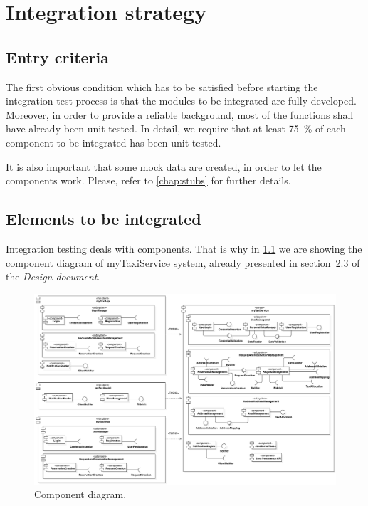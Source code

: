 \chapter{Integration strategy}\label{chap:strategy}



\section{Entry criteria}
The first obvious condition which has to be satisfied before starting the integration test process is that the modules to be integrated are fully developed. Moreover, in order to provide a reliable background, most of the functions shall have already been unit tested. In detail, we require that at least \SI{75}{\percent} of each component to be integrated has been unit tested. 

It is also important that some mock data are created, in order to let the components work. Please, refer to \cref{chap:stubs} for further details.



\section{Elements to be integrated}
Integration testing deals with components. That is why in \cref{fig:component} we are showing the component diagram of myTaxiService system, already presented in section~2.3 of the \emph{Design document}.

\begin{figure}%
	\centering%
	\includegraphics[width=\textwidth]{img/ComponentView__ComponentDiagram_1}%
	\caption{Component diagram.}%
	\label{fig:component}%
\end{figure}

